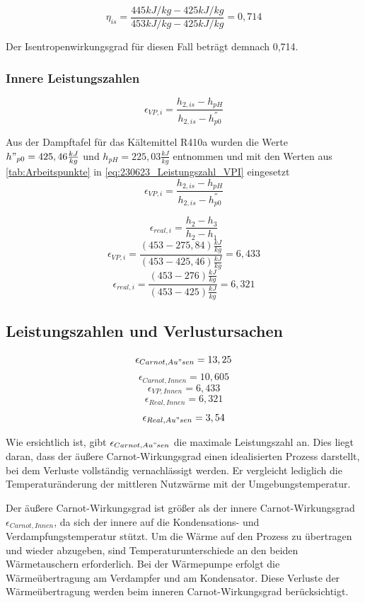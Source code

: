 $$\eta_{is}=\frac{445 kJ/kg-425 kJ/kg}{453 kJ/kg-425 kJ/kg}=0,714$$

Der Isentropenwirkungsgrad für diesen Fall beträgt demnach 0,714.\\


\subsubsection*{Innere Leistungszahlen}

\begin{equation}
   \epsilon_{VP,i} = \frac{h_{2,is}-h_{pH}}{h_{2,is}-h^{''}_{p0}}
\label{eq:230623_Leistungszahl_VPI}
\end{equation}

Aus der Dampftafel für das Kältemittel R410a wurden die Werte $h"_{p0}=425,46 \frac{kJ}{kg}$ und $h_{pH}= 225,03 \frac{kJ}{kg}$ entnommen und mit den Werten aus \autoref{tab:Arbeitspunkte} in \autoref{eq:230623_Leistungszahl_VPI} eingesetzt
$$\epsilon_{VP,i} = \frac{h_{2,is}-h_{pH}}{h_{2,is}-h^{''}_{p0}}$$

\begin{equation}
    \epsilon_{real,i}= \frac{h_2-h_3}{h_2-h_1}
\end{equation}
$$\epsilon_{VP,i}= \frac{(453-275,84)\frac{kJ}{kg}}{(453-425,46)\frac{kJ}{kg}} = 6,433 $$
$$\epsilon_{real,i}= \frac{(453-276)\frac{kJ}{kg}}{(453-425)\frac{kJ}{kg}} = 6,321 $$

\subsection{Leistungszahlen und Verlustursachen}


$$\epsilon_{Carnot,Au"sen} = 13,25$$
$$\epsilon_{Carnot,Innen} = 10,605$$
$$\epsilon_{VP,Innen} = 6,433$$
$$\epsilon_{Real,Innen} = 6,321$$
$$\epsilon_{Real,Au"sen} = 3,54$$

Wie ersichtlich ist, gibt $\epsilon_{Carnot,Au"sen}$ die maximale Leistungszahl an. 
Dies liegt daran, dass der äußere Carnot-Wirkungsgrad einen idealisierten Prozess darstellt, bei dem Verluste vollständig vernachlässigt werden. 
Er vergleicht lediglich die Temperaturänderung der mittleren Nutzwärme mit der Umgebungstemperatur.

Der äußere Carnot-Wirkungsgrad ist größer als der innere Carnot-Wirkungsgrad $\epsilon_{Carnot,Innen}$, da sich der innere auf die Kondensations- und Verdampfungstemperatur stützt. 
Um die Wärme auf den Prozess zu übertragen und wieder abzugeben, sind Temperaturunterschiede an den beiden Wärmetauschern erforderlich. 
Bei der Wärmepumpe erfolgt die Wärmeübertragung am Verdampfer und am Kondensator. 
Diese Verluste der Wärmeübertragung werden beim inneren Carnot-Wirkungsgrad berücksichtigt.

